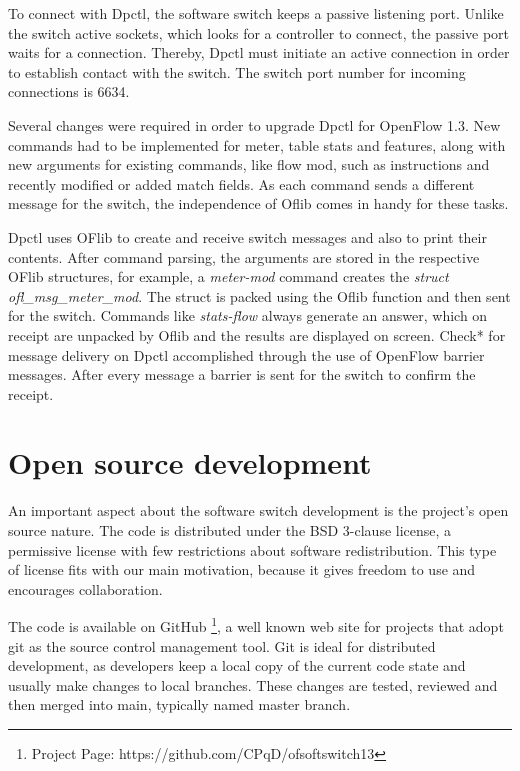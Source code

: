 To connect with Dpctl, the software switch keeps a passive listening port. Unlike the switch active sockets, which looks for a controller to connect, the passive port waits for a connection. Thereby, Dpctl must initiate an active connection in order to establish contact with the switch. The switch port number for incoming connections is 6634.

Several changes were required in order to upgrade Dpctl for OpenFlow 1.3. New commands had to be implemented for meter, table stats and features, along with new arguments for existing commands, like flow mod, such as instructions and recently modified or added match fields. As each command sends a different message for the switch, the independence of Oflib comes in handy for these tasks.  

Dpctl uses OFlib to create and receive switch messages and also to print their contents. After command parsing, the arguments are stored in the respective OFlib structures, for example, a \textit{meter-mod} command creates the \textit{struct ofl_msg_meter_mod}. The struct is packed using the Oflib function and then sent for the switch. Commands like \textit{stats-flow} always generate an answer, which on receipt are unpacked by Oflib and the results are displayed on screen. Check* for message delivery on Dpctl  accomplished through the use of OpenFlow barrier messages. After every message a barrier is sent for the switch to confirm the receipt.


\section{Open source development}
\label{OpenSourceDev}

An important aspect about the software switch development is the project's open source nature. The code is distributed under the BSD 3-clause license, a permissive license with few restrictions about software redistribution. This type of license fits with our main motivation, because it gives freedom to use and encourages collaboration. 

The code is available on GitHub \footnote{Project Page: https://github.com/CPqD/ofsoftswitch13}, a well known web site for projects that adopt git \cite{GIT} as the source control management tool. Git is ideal for distributed development, as developers keep a local copy of the current code state and usually make changes to local branches. These changes are tested, reviewed and then merged into main, typically named master branch.    

